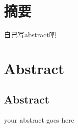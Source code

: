 \chapter{摘\quad 要}%
\linespread{1.5}

自己写abstract吧

\keywords{}%
\chapter{Abstract}%


\section*{Abstract}
your abstract goes here

